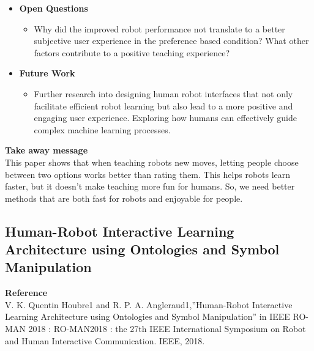 \documentclass[report.tex]{subfiles}
\begin{document}
\begin{itemize}
    \item \noindent\textbf {Open Questions}
    \begin{itemize}
        \item Why did the improved robot performance not translate to a better subjective user experience
in the preference based condition? What other factors contribute to a positive teaching
experience?
        
    \end{itemize}
    
    \item \noindent\textbf{Future Work}
    \begin{itemize}
        \item  Further research into designing human robot interfaces that not only facilitate efficient robot
learning but also lead to a more positive and engaging user experience. Exploring how
humans can effectively guide complex machine learning processes.
    \end{itemize}
\end{itemize}


\noindent\textbf{Take away message}  \\
This paper shows that when teaching robots new moves, letting people choose between two
options works better than rating them. This helps robots learn faster, but it doesn’t make
teaching more fun for humans. So, we need better methods that are both fast for robots and
enjoyable for people.























\subsection{Human-Robot Interactive Learning Architecture
using Ontologies and Symbol Manipulation} 

\noindent\textbf{Reference} \\
\cite{angleraud_human-robot_2018}V. K. Quentin Houbre1 and R. P. A. Angleraud1,”Human-Robot Interactive Learning Architecture
using Ontologies and Symbol Manipulation” in IEEE RO-MAN 2018 : RO-MAN2018 : the 27th
IEEE International Symposium on Robot and Human Interactive Communication. IEEE, 2018. \\
\end{document}
